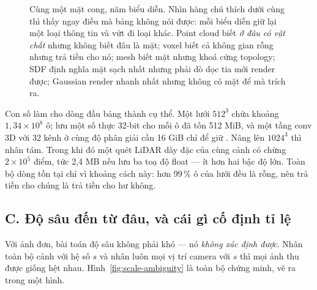 \documentclass[../../../deep_learning.tex]{subfiles}
\begin{document}
\begin{figure}[H]
{}
\caption{Cùng một mặt cong, năm biểu diễn. Nhìn hàng chú thích dưới cùng thì thấy ngay điều mà bảng không nói được: mỗi biểu diễn giữ lại một loại thông tin và vứt đi loại khác. Point cloud biết \emph{ở đâu có vật chất} nhưng không biết đâu là mặt; voxel biết cả không gian rỗng nhưng trả tiền cho nó; mesh biết mặt nhưng khoá cứng topology; SDF định nghĩa mặt sạch nhất nhưng phải dò dọc tia mới render được; Gaussian render nhanh nhất nhưng không có mặt để mà trích ra.}
\label{fig:nam-bieu-dien}
\end{figure}

Con số làm cho dòng đầu bảng thành cụ thể. Một lưới \(512^{3}\) chứa khoảng \(1{,}34\times 10^{8}\) ô; lưu một số thực 32-bit cho mỗi ô đã tốn 512 MiB, và một tầng conv 3D với 32 kênh ở cùng độ phân giải cần 16 GiB chỉ để giữ . Nâng lên \(1024^{3}\) thì nhân tám. Trong khi đó một quét LiDAR dày đặc của cùng cảnh có chừng \(2\times 10^{5}\) điểm, tức 2,4 MB nếu lưu ba toạ độ float --- ít hơn hai bậc độ lớn. Toàn bộ dòng  tồn tại chỉ vì khoảng cách này: hơn 99\,\% ô của lưới đều là rỗng, nên trả tiền cho chúng là trả tiền cho hư không.

\subsection{C. Độ sâu đến từ đâu, và cái gì cố định tỉ lệ}
Với ảnh đơn, bài toán độ sâu không phải khó --- nó \emph{không xác định được}. Nhân toàn bộ cảnh với hệ số \(s\) và nhân luôn mọi vị trí camera với \(s\) thì mọi ảnh thu được giống hệt nhau. Hình~\ref{fig:scale-ambiguity} là toàn bộ chứng minh, vẽ ra trong một hình.
\end{document}
